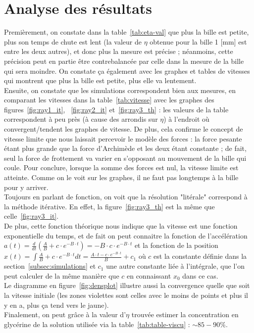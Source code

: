 \section{Analyse des résultats}\label{sec:analyse-des-resultats}
Premièrement, on constate dans la table~\ref{tab:eta-val} que plus la bille est petite, plus son
temps de chute est lent (la valeur de $\eta$ obtenue pour la bille 1 [mm] est entre les deux autres),
et donc plus la mesure est précise ;
néanmoins, cette précision peut en partie être contrebalancée par celle dans la mesure de la bille qui
sera moindre.
On constate ça également avec les graphes et tables de vitesses qui montrent que plus la bille est petite,
plus elle va lentement. \\
Ensuite, on constate que les simulations correspondent bien aux mesures, en comparant
les vitesses dans la table~\ref{tab:vitesse} avec les graphes des figures~\ref{fig:ray1_it}, ~\ref{fig:ray2_it} et~\ref{fig:ray3_th} : les valeurs de la table correspondent à peu près (à cause
des arrondis sur $\eta$) à l'endroit où convergent/tendent les graphes de vitesse.
De plus, cela confirme le concept de vitesse limite que nous laissait percevoir le modèle des forces :
la force pesante étant plus grande que la force d'Archimède et les deux étant constante ;
de fait, seul la force de frottement va varier en s'opposant au mouvement de la bille qui coule.
Pour conclure, lorsque la somme des forces est nul, la vitesse limite est atteinte.
Comme on le voit sur les graphes, il ne faut pas longtemps à la bille pour y arriver.
\\
Toujours en parlant de fonction, on voit que la résolution "litérale" correspond à la méthode
itérative.
En effet, la figure~\ref{fig:ray3_th} est la même que celle~\ref{fig:ray3_it}. \\
De plus, cette fonction théorique nous indique que la vitesse est une fonction exponentielle du
temps, et de fait on peut connaitre la fonction de l'accélération $a(t)= \frac{d}{dt} \left( \frac{A}{B}+c \cdot
e^{-B\cdot t} \right)= -B\cdot c\cdot e^{-B \cdot t} $ et la fonction de la position
$ x(t) = \int \frac{A}{B}+c \cdot e^{-B\cdot t} dt = \frac{A \cdot t - c \cdot e^{-B\cdot t}}{B} + c_{1} $
où $c$ est la constante définie dans la section~\ref{subsec:simulations} et $c_{1}$ une autre constante
liée à l'intégrale, que l'on peut calculer de la même manière que $c$ en connaissant $x_{0}$ dans ce cas.\\
Le diagramme en figure~\ref{fig:densplot} illustre aussi la convergence quelle que soit la vitesse
initiale (les zones violettes sont celles avec le moins de points et plus il y en a, plus ça tend vers
le jaune). \\
Finalement, on peut grâce à la valeur d'$\eta$ trouvée estimer la concentration en glycérine de la
solution utilisée via la table~\ref{tab:table-viscu} : $\sim 85-90 \%$.

